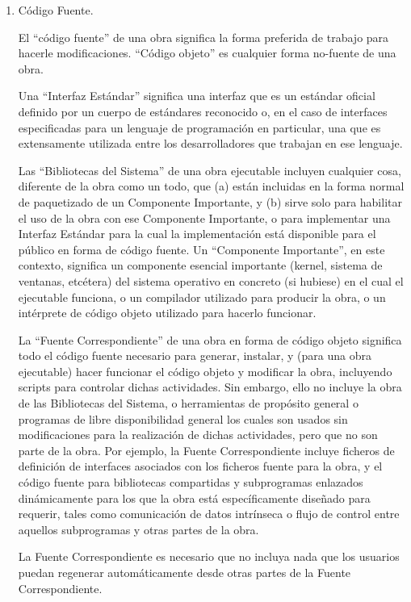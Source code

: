 \documentclass[11pt]{article}
\begin{document}
\begin{enumerate}
\item C\'{o}digo Fuente.

El ``c\'{o}digo fuente'' de una obra significa la forma preferida de
trabajo para hacerle modificaciones. ``C\'{o}digo objeto'' es cualquier 
forma no-fuente de una obra.

Una ``Interfaz Est\'{a}ndar'' significa una interfaz que es un est\'{a}ndar 
oficial definido por un cuerpo de est\'{a}ndares reconocido o, en el 
caso de interfaces especificadas para un lenguaje de programaci\'{o}n en
particular, una que es extensamente utilizada entre los
desarrolladores que trabajan en ese lenguaje.

Las ``Bibliotecas del Sistema'' de una obra ejecutable incluyen
cualquier cosa, diferente de la obra como un todo, que (a) est\'{a}n incluidas en la forma normal de paquetizado de un Componente Importante, y (b) sirve solo para habilitar el uso de la obra con ese Componente Importante, o para implementar una Interfaz Est\'{a}ndar
para la cual la implementaci\'{o}n est\'{a} disponible para el p\'{u}blico en
forma de c\'{o}digo fuente. Un ``Componente Importante'', en este
contexto, significa un componente esencial importante (kernel,
sistema de ventanas, etc\'{e}tera) del sistema operativo en concreto (si hubiese) en el cual el ejecutable funciona, o un compilador
utilizado para producir la obra, o un int\'{e}rprete de c\'{o}digo objeto
utilizado para hacerlo funcionar.

La ``Fuente Correspondiente'' de una obra en forma de c\'{o}digo
objeto significa todo el c\'{o}digo fuente necesario para generar,
instalar, y (para una obra ejecutable) hacer funcionar el c\'{o}digo
objeto y modificar la obra, incluyendo scripts para controlar
dichas actividades. Sin embargo, ello no incluye la obra de las Bibliotecas del Sistema, o herramientas de prop\'{o}sito general o
programas de libre disponibilidad general los cuales son usados sin
modificaciones para la realizaci\'{o}n de dichas actividades, pero que no son parte de la obra. Por ejemplo, la Fuente Correspondiente incluye ficheros de definici\'{o}n de interfaces asociados con los ficheros fuente para la obra, y el c\'{o}digo fuente para bibliotecas compartidas y subprogramas enlazados din\'{a}micamente para los que la obra est\'{a} espec\'{i}ficamente dise\~nado para requerir, tales como comunicaci\'{o}n de datos intr\'{i}nseca o flujo de control entre aquellos subprogramas y otras partes de la obra.

La Fuente Correspondiente es necesario que no incluya nada que los usuarios puedan regenerar autom\'{a}ticamente desde otras partes de la Fuente Correspondiente.


\end{enumerate}
\end{document}

